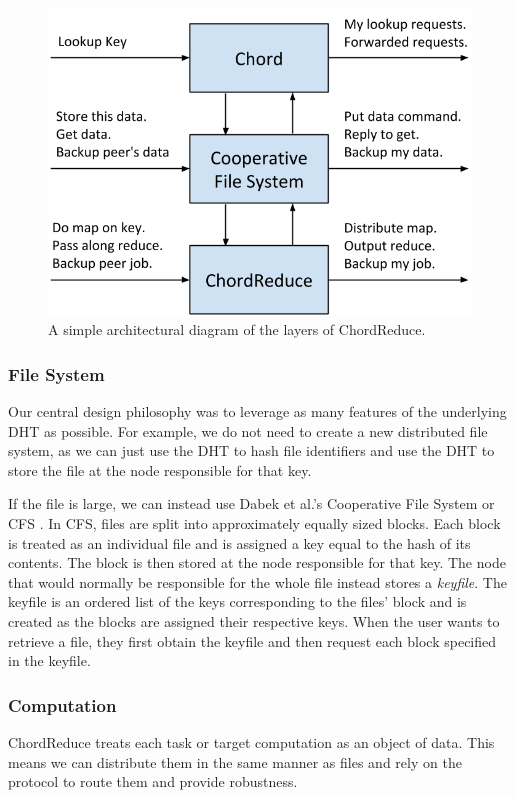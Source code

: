 \begin{figure}
	\centering
	\includegraphics[width=0.8\linewidth]{figs/CR_architecture}
	\caption{A simple architectural diagram of the layers of ChordReduce.}	
	\label{fig:cr_arch}
\end{figure}



\subsubsection{File System}
Our central design philosophy was to leverage as many features of the underlying DHT as possible.
For example, we do not need to create a new distributed file system, as we can just use the DHT to hash file identifiers and use the DHT to store the file at the node responsible for that key.

If the file is large, we can instead use Dabek et al.'s Cooperative File System or CFS \cite{CFS}.
In CFS, files are split into approximately equally sized blocks.
Each block is treated as an individual file and is assigned a key equal to the hash of its contents.
The block is then stored at the node responsible for that key.
The node that would normally be responsible for the whole file instead stores a \textit{keyfile}.
The keyfile is an ordered list of the keys corresponding to the files' block and is created as the blocks are assigned their respective keys.
When the user wants to retrieve a file, they first obtain the keyfile and then request each block specified in the keyfile.


\subsubsection{Computation}
ChordReduce treats each task or target computation as an object of data.
This means we can distribute them in the same manner as files and rely on the protocol to route them and provide robustness.


